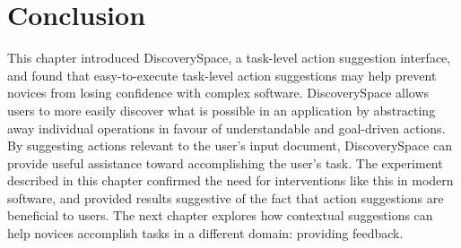 \section{Conclusion}
This chapter introduced Discovery\-Space, a task-level action suggestion interface, and found that easy-to-execute task-level action suggestions may help prevent novices from losing confidence with complex software. Discovery\-Space allows users to more easily discover what is possible in an application by abstracting away individual operations in favour of understandable and goal-driven actions. By suggesting actions relevant to the user's input document, Discovery\-Space can provide useful assistance toward accomplishing the user's task. The experiment described in this chapter confirmed the need for interventions like this in modern software, and provided results suggestive of the fact that action suggestions are beneficial to users. The next chapter explores how contextual suggestions can help novices accomplish tasks in a different domain: providing feedback.